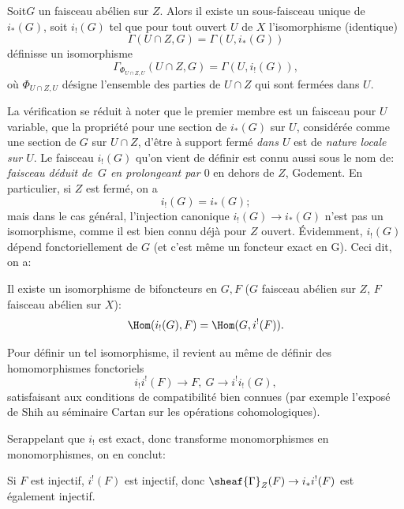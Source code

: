 \begin{proposition} \label{I.1.2}
Soit\pageoriginale $G$ un faisceau ab\'elien sur $Z$. Alors il existe un sous-faisceau unique de $i_*(G)$, soit $i_!(G)$ tel que pour tout ouvert $U$ de $X$ l'isomorphisme (identique)
$$
\Gamma(U\cap Z, G)= \Gamma(U, i_*(G))$$
d\'efinisse un isomorphisme
$$
\Gamma_{\Phi_{U\cap Z, U}}(U\cap Z, G)=\Gamma(U, i_! (G)),
$$
o\`u $\Phi_{U\cap Z, U}$ d\'esigne l'ensemble des parties de $U\cap Z$ qui sont ferm\'ees dans $U$.
\end{proposition}

La v\'erification se r\'eduit \`a noter que le premier membre est un faisceau pour $U$ variable, \ie que la propri\'et\'e pour une section de $i_*(G)$ sur $U$, consid\'er\'ee comme une section de $G$ sur $U\cap Z$, d'\^etre \`a support ferm\'e \textit{dans $U$} est de \textit{nature locale sur $U$}. Le faisceau $i_!(G)$ qu'on vient de d\'efinir est connu aussi sous le nom de: \textit{faisceau d\'eduit de~$G$ en prolongeant par $0$} en dehors de $Z$, \cf Godement. En particulier, si $Z$ est ferm\'e, on a
\begin{equation} \label{eq:I.9} {i_!(G)=i_*(G)};
\end{equation}
mais dans le cas g\'en\'eral, l'injection canonique $i_!(G) \to i_*(G)$ n'est pas un isomorphisme, comme il est bien connu d\'ej\`a pour $Z$ ouvert. \'Evidemment, $i_!(G)$ d\'epend fonctoriellement de $G$ (et c'est m\^eme un foncteur exact en G). Ceci dit, on a:

\begin{proposition} \label{I.1.3} Il existe un isomorphisme de bifoncteurs en $G, F$ ($G$ faisceau ab\'elien sur $Z$, $F$ faisceau ab\'elien sur $X$):
\begin{equation} \label{eq:I.10} {\Hom(i_!(G), F) = \Hom (G, i^!(F))}.
\end{equation}
\end{proposition}

Pour d\'efinir un tel isomorphisme, il revient au m\^eme de d\'efinir des homomorphismes fonctoriels
$$i_!i^!(F) \to F, \ G \to i^!i_!(G),
$$
satisfaisant aux conditions de compatibilit\'e bien connues (\cf par exemple l'expos\'e de Shih au s\'eminaire Cartan sur les op\'erations cohomologiques).

Se\pageoriginaled rappelant que $i_!$ est exact, donc transforme monomorphismes en monomorphismes, on en conclut:

\begin{corollaire} \label{I.1.4}
Si $F$ est injectif, $i^!(F)$ est injectif, donc $\sheaf{\Gamma}_Z(F) \to i_*i^!(F)$ est \'egalement injectif.
\end{corollaire}

